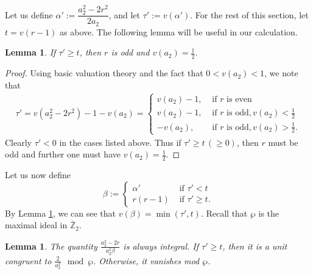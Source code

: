 \documentclass[11pt, reqno]{amsart}
\numberwithin{equation}{section}
\newcommand{\Z}{\mathbb{Z}}
\newtheorem{lemma}[thm]{Lemma}
\theoremstyle{definition}
\theoremstyle{remark}
\theoremstyle{definition}
\theoremstyle{remark}
\theoremstyle{remark}
\begin{document}
Let us define $\alpha':= \dfrac{a_{2}^{2}-2r^{2}}{2a_{2}}$, and let $\tau' := v\left( \alpha'\right)$. For the rest of this section, let $t=v(r-1) $ as above.
 The following lemma will be useful in our calculation.
\begin{lemma}\label{Lemmatomt}
If $\tau'\geq t$, then $r$ is odd and $v(a_{2})=\frac{1}{2}$.
   \end{lemma}
\begin{proof}
Using basic valuation theory and the fact that $0<v(a_2)<1$, we note that
\begin{eqnarray}
    \tau' = v(a_{2}^2-2r^2)-1-v(a_{2})=\begin{cases}
    v(a_2)-1, & \text{ if } r \text{ is even }\\
    v(a_2)-1, & \text{ if } r \text{ is odd}, v(a_2)<\frac{1}{2}\\
    -v(a_2),& \text{ if } r \text{ is odd}, v(a_2)>\frac{1}{2}.
    \end{cases}
\end{eqnarray}
Clearly $\tau'<0$ in the cases listed above.%
Thus if $\tau'\geq t \,(\geq 0)$, then $r$ must be odd and further one must have $v(a_2)=\frac{1}{2}$.
\end{proof}
Let us now define \begin{equation}\label{beta}
\beta := \begin{cases}
    \alpha' &\text{ if } \tau'<t\\
    r(r-1) &\text{ if } \tau'\geq t.
\end{cases}
\end{equation}
By Lemma \ref{Lemmatomt}, we can see that $v(\beta ) = \min(\tau',t)$. Recall that $\wp$ is the maximal ideal in $\bar{\Z}_{2}$. 
\begin{lemma}\label{rem1}
The quantity $\frac{a_{2}^2-2r}{a_{2}^2\beta}$ is always integral. If $\tau'\geq t$, then it is a unit congruent to $\frac{2}{a_2^2}\mod\wp$. Otherwise, it vanishes mod $\wp$.
\end{lemma}
\end{document}
